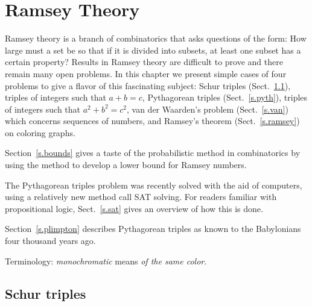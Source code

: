 
\chapter{Ramsey Theory}\label{c.ramsey}



Ramsey theory is a branch of combinatorics that asks questions of the form: How large must a set be so that if it is divided into subsets, at least one subset has a certain property?
Results in Ramsey theory are difficult to prove and there remain many open problems. In this chapter we present simple cases of four problems to give a flavor of this fascinating subject: Schur triples (Sect.~\ref{s.schur}), triples of integers such that $a+b=c$, Pythagorean triples (Sect.~\ref{s.pyth}), triples of integers such that $a^2+b^2=c^2$, van der Waarden's problem (Sect.~\ref{s.van}) which concerns sequences of numbers, and Ramsey's theorem (Sect.~\ref{s.ramsey}) on coloring graphs.

Section~\ref{s.bounds} gives a taste of the probabilistic method in combinatorics by using the method to develop a lower bound for Ramsey numbers.

The Pythagorean triples problem was recently solved with the aid of computers, using a relatively new method call SAT solving. For readers familiar with propositional logic, Sect.~\ref{s.sat} gives an overview of how this is done.

Section~\ref{s.plimpton} describes Pythagorean triples as known to the Babylonians four thousand years ago.

Terminology: \emph{monochromatic} means \emph{of the same color}.

\vspace{-3ex}

\section{Schur triples}\label{s.schur}

